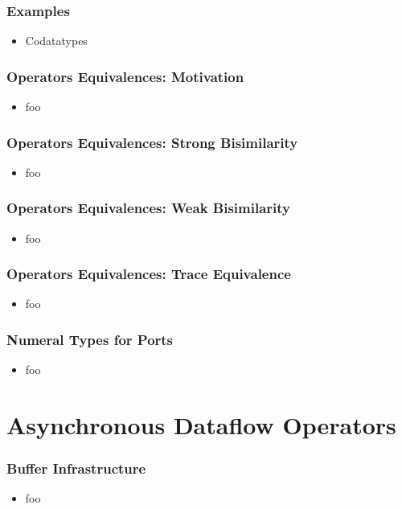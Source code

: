 \documentclass[aspectratio=169,10pt]{beamer}
\begin{document}
\begin{frame}[fragile]
  \frametitle{Examples}
  \begin{itemize}
    \item Codatatypes
          \vspace*{-1ex}
  \end{itemize}
\end{frame}

\begin{frame}[fragile]
  \frametitle{Operators Equivalences: Motivation}
  \begin{itemize}
    \item foo
  \end{itemize}
\end{frame}

\begin{frame}[fragile]
  \frametitle{Operators Equivalences: Strong Bisimilarity}
  \begin{itemize}
    \item foo
  \end{itemize}
\end{frame}

\begin{frame}[fragile]
  \frametitle{Operators Equivalences: Weak Bisimilarity}
  \begin{itemize}
    \item foo
  \end{itemize}
\end{frame}

\begin{frame}[fragile]
  \frametitle{Operators Equivalences: Trace Equivalence}
  \begin{itemize}
    \item foo
  \end{itemize}
\end{frame}

\begin{frame}[fragile]
  \frametitle{Numeral Types for Ports}
  \begin{itemize}
    \item foo
  \end{itemize}
\end{frame}

\section{Asynchronous Dataflow Operators}

\begin{frame}[fragile]
  \frametitle{Buffer Infrastructure}
  \begin{itemize}
    \item foo
  \end{itemize}
\end{frame}
\end{document}
